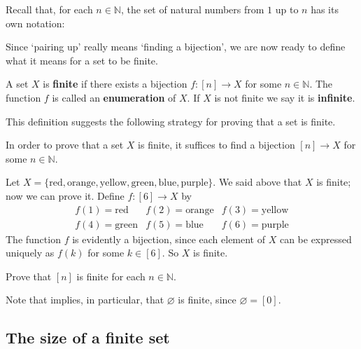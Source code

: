 Recall that, for each $n \in \mathbb{N}$, the set of natural numbers from $1$ up to $n$ has its own notation:

\RSdefBracketN*

Since `pairing up' really means `finding a bijection', we are now ready to define what it means for a set to be finite.

\begin{definition}
\label{defFiniteSet}
A set $X$ is \textbf{finite} if there exists a bijection $f : [n] \to X$ for some $n \in \mathbb{N}$. The function $f$ is called an \textbf{enumeration} of $X$. If $X$ is not finite we say it is \textbf{infinite}.
\end{definition}

This definition suggests the following strategy for proving that a set is finite.

\begin{strategy}
In order to prove that a set $X$ is finite, it suffices to find a bijection $[n] \to X$ for some $n \in \mathbb{N}$.
\end{strategy}

\begin{example}
\label{exSomeFiniteSets}
Let $X = \{ \text{red}, \text{orange}, \text{yellow}, \text{green}, \text{blue}, \text{purple} \}$. We said above that $X$ is finite; now we can prove it. Define $f : [6] \to X$ by
\[ \begin{matrix}
f(1) = \text{red} & f(2) = \text{orange} & f(3) = \text{yellow} \\
f(4) = \text{green} & f(5) = \text{blue} & f(6) = \text{purple}
\end{matrix} \]
The function $f$ is evidently a bijection, since each element of $X$ can be expressed uniquely as $f(k)$ for some $k \in [6]$. So $X$ is finite.
\end{example}

\begin{exercise}
\label{exBracketNIsFinite}
Prove that $[n]$ is finite for each $n \in \mathbb{N}$.
\end{exercise}

Note that  implies, in particular, that $\varnothing$ is finite, since $\varnothing = [0]$.

\subsection*{The size of a finite set}

